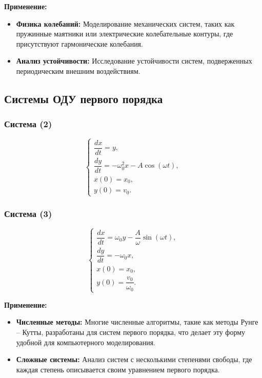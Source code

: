\documentclass[12pt,a4paper]{article}
\begin{document}
\textbf{Применение:}
\begin{itemize}
    \item \textbf{Физика колебаний:} Моделирование механических систем, таких как пружинные маятники или электрические колебательные контуры, где присутствуют гармонические колебания.
    \item \textbf{Анализ устойчивости:} Исследование устойчивости систем, подверженных периодическим внешним воздействиям.
\end{itemize}

\subsection{Системы ОДУ первого порядка}
\subsubsection{Система (2)}
\begin{equation}
\begin{cases}
\dfrac{dx}{dt} = y, \\
\dfrac{dy}{dt} = -\omega_0^2 x - A\cos(\omega t), \\
x(0) = x_0, \\
y(0) = v_0.
\end{cases}
\end{equation}

\subsubsection{Система (3)}
\begin{equation}
\begin{cases}
\dfrac{dx}{dt} = \omega_0 y - \dfrac{A}{\omega}\sin(\omega t), \\
\dfrac{dy}{dt} = -\omega_0 x, \\
x(0) = x_0, \\
y(0) = \dfrac{v_0}{\omega_0}.
\end{cases}
\end{equation}

\textbf{Применение:}
\begin{itemize}
    \item \textbf{Численные методы:} Многие численные алгоритмы, такие как методы Рунге -- Кутты, разработаны для систем первого порядка, что делает эту форму удобной для компьютерного моделирования.
    \item \textbf{Сложные системы:} Анализ систем с несколькими степенями свободы, где каждая степень описывается своим уравнением первого порядка.
\end{itemize}
\end{document}
